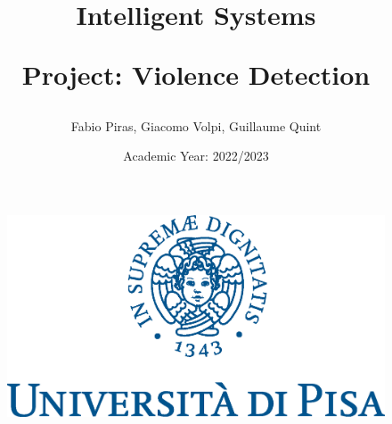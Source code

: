

\author{Fabio Piras, Giacomo Volpi, Guillaume Quint}
\title{Intelligent Systems

Project: Violence Detection }
\date{Academic Year: 2022/2023}

\begin{figure}
\centering

\includegraphics[scale=0.75]{./images/cherubino}

\end{figure}
\maketitle
\thispagestyle{empty}
\newpage

\tableofcontents

\thispagestyle{empty}

